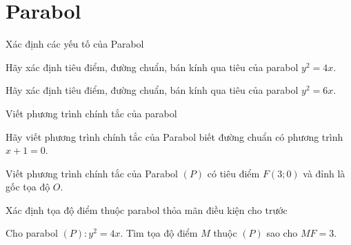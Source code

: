 \section*{Parabol}
\begin{dang}{Xác định các yếu tố của Parabol}
\end{dang}
\begin{vd}
	Hãy xác định tiêu điểm, đường chuẩn, bán kính qua tiêu của parabol $ y^2=4x $.
\end{vd}
\begin{vd}
	Hãy xác định tiêu điểm, đường chuẩn, bán kính qua tiêu của parabol $ y^2=6x $.
\end{vd}
\begin{dang}{Viết phương trình chính tắc của parabol}
\end{dang}
\begin{vd}
	Hãy viết phương trình chính tắc của Parabol biết đường chuẩn có phương trình $ x + 1 = 0 $.
\end{vd}
\begin{vd}
	Viết phương trình chính tắc của Parabol $ (P) $ có tiêu điểm $ F(3 ; 0) $ và đỉnh là gốc tọa độ $ O $.
\end{vd}
\begin{dang}{Xác định tọa độ điểm thuộc parabol thỏa mãn điều kiện cho trước}
\end{dang}
\begin{vd}
	Cho parabol $ (P):y^2=4x $. Tìm tọa độ điểm $ M $ thuộc $ (P) $ sao cho $ MF=3 $.
\end{vd}

